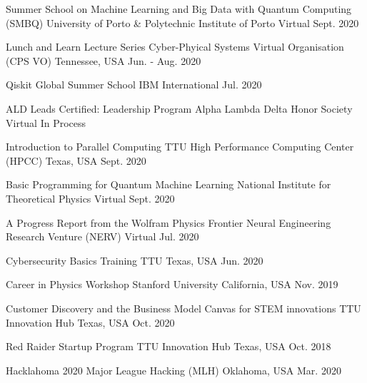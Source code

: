 

\begin{cvhonors}
    \cvhonor
    {Summer School on Machine Learning and Big Data with Quantum Computing (SMBQ)}
    {University of Porto \& Polytechnic Institute of Porto}
    {Virtual}
    {Sept. 2020}

    \cvhonor
    {Lunch and Learn Lecture Series}
    {Cyber-Phyical Systems Virtual Organisation (CPS VO) }
    {Tennessee, USA}
    {Jun. - Aug. 2020}

    \cvhonor
    {Qiskit Global Summer School}
    {IBM}
    {International}
    {Jul. 2020}

\end{cvhonors}


\begin{cvhonors}

    \cvhonor
    {ALD Leads Certified: Leadership Program}
    {Alpha Lambda Delta Honor Society}
    {Virtual}
    {In Process}

    \cvhonor
    {Introduction to Parallel Computing}
    {TTU High Performance Computing Center (HPCC)}
    {Texas, USA}
    {Sept. 2020}


    \cvhonor
    {Basic Programming for Quantum Machine Learning}
    {National Institute for Theoretical Physics}
    {Virtual}
    {Sept. 2020}

    \cvhonor
    {A Progress Report from the Wolfram Physics Frontier}
    {Neural Engineering Research Venture (NERV)}
    {}
    {Virtual}
    {Jul. 2020}

    \cvhonor
    {Cybersecurity Basics Training}
    {TTU}
    {Texas, USA}
    {Jun. 2020}

    \cvhonor
    {Career in Physics Workshop}
    {Stanford University}
    {California, USA}
    {Nov. 2019}

    \cvhonor
    {Customer Discovery and the Business Model Canvas for STEM innovations}
    {TTU Innovation Hub}
    {Texas, USA}
    {Oct. 2020}

    \cvhonor
    {Red Raider Startup Program}
    {TTU Innovation Hub}
    {Texas, USA}
    {Oct. 2018}

\end{cvhonors}



\begin{cvhonors}
    \cvhonor
    {Hacklahoma 2020}
    {Major League Hacking (MLH)}
    {Oklahoma, USA}
    {Mar. 2020}

\end{cvhonors}
